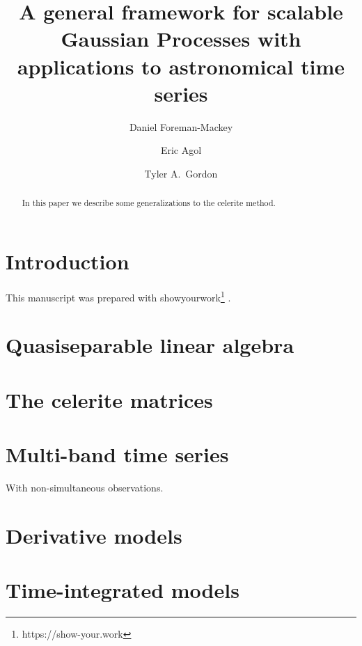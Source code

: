 \documentclass[modern]{aastex631}
\newcommand{\project}[1]{\textsf{#1}}
\begin{document}
\title{A general framework for scalable Gaussian Processes with applications to astronomical time series}

\author[0000-0002-9328-5652]{Daniel Foreman-Mackey}

\author[0000-0002-0802-9145]{Eric Agol}

\author[0000-0001-5253-1987]{Tyler A.\ Gordon}

\begin{abstract}
    In this paper we describe some generalizations to the \project{celerite} method.
\end{abstract}


\section{Introduction}
\label{sec:intro}

This manuscript was prepared with \project{showyourwork}\footnote{https://show-your.work} \citep{Luger:2021}.

\section{Quasiseparable linear algebra}

\section{The \project{celerite} matrices}

\section{Multi-band time series}

With non-simultaneous observations.

\section{Derivative models}

\section{Time-integrated models}
\end{document}
